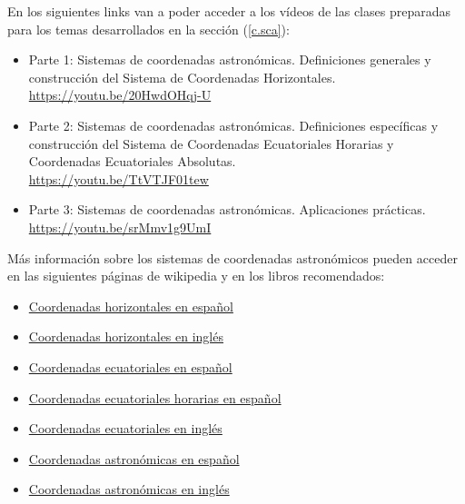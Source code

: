 En los siguientes links van a poder acceder a los vídeos de las clases
preparadas para los temas desarrollados en la sección (\ref{c.sca}):

\begin{itemize}
  \item Parte 1: Sistemas de coordenadas astronómicas. Definiciones generales y
    construcción del Sistema de Coordenadas Horizontales.\\
    \href{https://youtu.be/20HwdOHqj-U}{https://youtu.be/20HwdOHqj-U}
  \item Parte 2: Sistemas de coordenadas astronómicas. Definiciones específicas
    y construcción del Sistema de Coordenadas Ecuatoriales Horarias y
    Coordenadas Ecuatoriales Absolutas.\\
    \href{https://youtu.be/TtVTJF01tew}{https://youtu.be/TtVTJF01tew} \\
  \item Parte 3: Sistemas de coordenadas astronómicas. Aplicaciones prácticas.\\
    \href{https://youtu.be/srMmv1g9UmI}{https://youtu.be/srMmv1g9UmI} \\
\end{itemize}

Más información sobre los sistemas de coordenadas astronómicos pueden acceder en
las siguientes páginas de wikipedia y en los libros recomendados:
\begin{itemize}
  \item 
    \href{https://es.wikipedia.org/w/index.php?title=Coordenadas_horizontales}
    {Coordenadas horizontales en español}
  \item 
    \href{https://en.wikipedia.org/wiki/Horizontal_coordinate_system}
    {Coordenadas horizontales en inglés}
  \item  
    \href{https://es.wikipedia.org/wiki/Coordenadas_ecuatoriales}
    {Coordenadas ecuatoriales en español}
  \item  
    \href{https://es.wikipedia.org/wiki/Coordenadas_horarias}
    {Coordenadas ecuatoriales horarias en español}
  \item 
    \href{https://en.wikipedia.org/wiki/Equatorial_coordinate_system}
    {Coordenadas ecuatoriales en inglés}
  \item 
    \href{https://es.wikipedia.org/wiki/Coordenadas_celestes}
    {Coordenadas astronómicas en español}
  \item
    \href{https://en.wikipedia.org/wiki/Celestial_coordinate_system}
    {Coordenadas astronómicas en inglés}
\end{itemize}

